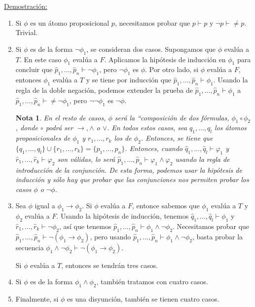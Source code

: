 \documentclass[18pt]{article}
\newtheorem{nota}{Nota}
\begin{document}
\underline{Demostración:}


\begin{enumerate}
\item Si $\phi$ es un átomo proposicional $p$, necesitamos probar que $p\vdash p$ y $\neg p \vdash \neq p$. Trivial.
\item Si $\phi$ es de la forma $\neg \phi_1$, se consideran dos casos. Supongamos que $\phi$ evalúa a $T$. En este caso $\phi_1$ evalúa a $F$. Aplicamos la hipótesis de inducción en $\phi_1$ para concluir que $\hat{p}_1,\dots , \hat{p}_n \vdash \neg \phi_1$, pero $\neg \phi_1$ es $\phi$. Por otro lado, si $\phi$ evalúa a $F$, entonces $\phi_1$ evalúa a $T$ y se tiene por inducción que $\hat{p}_1,\dots,\hat{p}_n \vdash \phi_1$. Usando la regla de la doble negación, podemos extender la prueba de $\hat{p}_1,\dots, \hat{p}_n \vdash \phi_1$ a $\hat{p}_1,\dots, \hat{p}_n \vdash \neq \neg \phi_1$, pero $\neg \neg \phi_1$ es $\neg \phi$.

  \begin{nota}
En el resto de casos, $\phi$ será la ``composición de dos fórmulas, $\phi_1 \circ  \phi_2$, donde $\circ$ podrá ser $\rightarrow , \wedge$ o $\vee$. En todos estos casos, sea $q_1,\dots, q_l$ los átomos proposicionales de $\phi_1$ y $r_1,\dots, r_k$ los de $\phi_2$. Entonces, se tiene que $\{q_1,\dots, q_l \} \cup \{r_1,\dots, r_k \} = \{ p_1,\dots, p_n \}$. Entonces, cuando $\hat{q}_1,\dots, \hat{q}_l \vdash \varphi_1$ y $\hat{r}_1,\dots, \hat{r}_k \vdash \varphi_2$ son válidas, lo será $\hat{p}_1,\dots, \hat{p}_n  \vdash \varphi_1\wedge \varphi_2$ usando la regla de introducción de la conjunción.  De esta forma, podemos usar la hipótesis de inducción y sólo hay que probar que las conjunciones nos permiten probar los casos $\phi$ o $\neg \phi$. 
\end{nota}


\item Sea $\phi$ igual a $\phi_1 \rightarrow \phi_2 $. Si $\phi$ evalúa a $F$, entonce sabemos que $\phi_1$ evalúa a $T$ y $\phi_2$ evalúa a $F$. Usando la hipótesis de inducción, tenemos $\hat{q}_1,\dots, \hat{q}_l \vdash \phi_1$ y $\hat{r}_1,\dots, \hat{r}_k \vdash \neg \phi_2$, así que tenemos $ \hat{p}_1,\dots, \hat{p}_n \vdash \phi_1\wedge \neg \phi_2$.  Necesitamos probar que $\hat{p}_1,\dots, \hat{p}_n \vdash \neg (\phi_1\rightarrow \phi_2)$, pero usando $ \hat{p}_1,\dots, \hat{p}_n \vdash \phi_1\wedge \neg \phi_2$, basta probar la secuencia $\phi_1\wedge \neg \phi_2 \vdash \neg (\phi_1 \rightarrow \phi_2)$.

  Si $\phi$ evalúa a $T$, entonces se tendrán tres casos.

\item Si $\phi$ es de la forma $\phi_1 \wedge \phi_2$, también tratamos con cuatro casos.
\item Finalmente, si $\phi$ es una disyunción, también se tienen cuatro casos. 
\end{enumerate}
\end{document}
